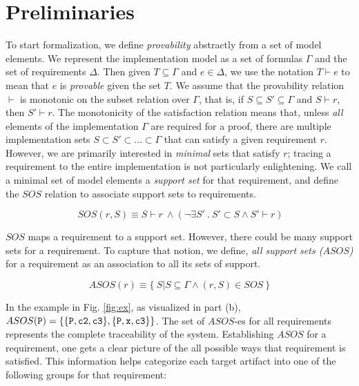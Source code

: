 
\section{Preliminaries}
\label{sec:background}
\newcommand{\satisfies}{\vdash_{\!\!s}}
\newcommand{\nsatisfies}{\nvdash_{\!\!s}}

To start formalization, we define \emph{provability} abstractly from a set of model elements.  We represent the implementation model as a set of formulas $\Gamma$  and the set of requirements $\Delta$.  Then given $T \subseteq \Gamma$ and $e \in \Delta$, we use the notation $T \vdash e$ to mean that $e$ is \emph{provable} given the set $T$.  We assume that the provability relation $\vdash$ is monotonic on the subset relation over $\Gamma$, that is, if $S \subseteq S' \subseteq \Gamma$ and $S \vdash r$, then $S' \vdash r$.  The monotonicity of the satisfaction relation means that, unless {\em all} elements of the implementation $\Gamma$ are required for a proof, there are multiple implementation sets $S \subset S' \subset \ldots \subset \Gamma$ that can satisfy a given requirement $r$.  However, we are primarily interested in {\em minimal} sets that satisfy $r$; tracing a requirement to the entire implementation is not particularly enlightening.  We call a minimal set of model elements a \emph{support set} for that requirement, and define the $SOS$ relation to associate support sets to requirements.

$$ \ SOS(r, S) \equiv S \vdash r~ \land   (\neg\exists S'\ .\ S' \subset S \wedge S' \vdash r) $$

$SOS$ maps a requirement to a support set. However, there could be many support sets for a requirement. To capture that notion, we define, \emph{all support sets ($ASOS$)} for a requirement as an association to all its sets of support.


$$ ASOS(r) \equiv  \{\ S | S \subseteq \Gamma \land (r,S) \in SOS\ \} $$

In the example in Fig. \ref{fig:ex}, as visualized in part (b), 
$ASOS ({\tt P}) = \{\{{\tt P}, {\tt c2}, {\tt c3}\}, \{{\tt P}, {\tt x}, {\tt c3}\}\}$. The set of $ASOS$-es for all requirements represents the complete traceability of the system. Establishing $ASOS$ for a requirement, one gets a clear picture of the all possible ways that requirement is satisfied. This information helps categorize each target artifact into one of the following groups for that requirement:

